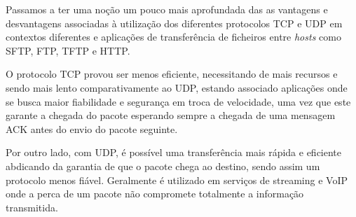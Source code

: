 \documentclass[runningheads]{llncs}
\begin{document}
    Passamos a ter uma noção um pouco mais aprofundada das as vantagens e desvantagens associadas à utilização dos diferentes protocolos TCP e UDP em contextos diferentes e aplicações de transferência de ficheiros entre \textit{hosts} como SFTP, FTP, TFTP e HTTP.
    
    O protocolo TCP provou ser menos eficiente, necessitando de mais recursos e sendo mais lento comparativamente ao UDP, estando associado aplicações onde se busca maior fiabilidade e segurança em troca de velocidade, uma vez que este garante a chegada do pacote esperando sempre a chegada de uma mensagem ACK antes do envio do pacote seguinte.
    
    Por outro lado, com UDP, é possível uma transferência mais rápida e eficiente abdicando da garantia de que o pacote chega ao destino, sendo assim um protocolo menos fiável. Geralmente é utilizado em serviços de streaming e VoIP onde a perca de um pacote não compromete totalmente a informação transmitida.
    
\end{document}
